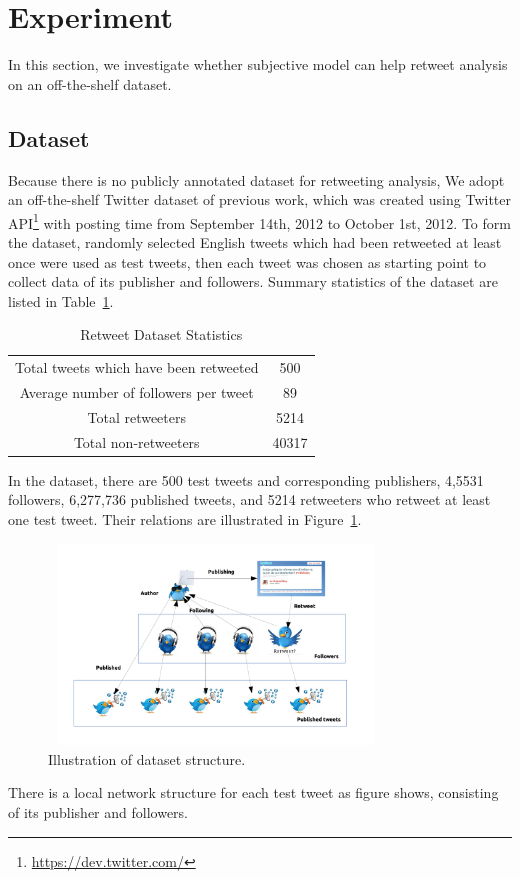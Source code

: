 \documentclass{acm_proc_article-sp}
\begin{document}
\section{Experiment}
\label{experiment}
In this section, we investigate whether subjective model can help retweet analysis on an off-the-shelf dataset. 

\subsection{Dataset}
Because there is no publicly annotated dataset for retweeting analysis, We adopt an off-the-shelf Twitter dataset of previous work\cite{Luo:2013RMF}, which was created using Twitter API\footnote{\url{https://dev.twitter.com/}} with posting time from September 14th, 2012 to October 1st, 2012.
To form the dataset, randomly selected English tweets which had been retweeted at least once were used as test tweets, then each tweet was chosen as starting point to collect data of its publisher and followers.
Summary statistics of the dataset are listed in Table~\ref{datasetstat}.
\begin{table}
\centering
\caption{Retweet Dataset Statistics}
\label{datasetstat}
\begin{tabular}{|c|c|}
\hline
Total tweets which have been retweeted & 500 \\
Average number of followers per tweet & 89 \\
Total retweeters & 5214 \\
Total non-retweeters & 40317  \\
\hline
\end{tabular}
\end{table}
In the dataset, there are 500 test tweets and corresponding publishers, 4,5531 followers, 6,277,736 published tweets, and 5214 retweeters who retweet at least one test tweet. 
Their relations are illustrated in Figure~\ref{fig:graph3}.
\begin{figure}[htb]
\centering%
\includegraphics[width=3.5in,height=2.1in]{dataset.pdf}
\caption{Illustration of dataset structure.}
\label{fig:graph3}
\end{figure}
There is a local network structure for each test tweet as figure shows, consisting of its publisher and followers.
\end{document}
